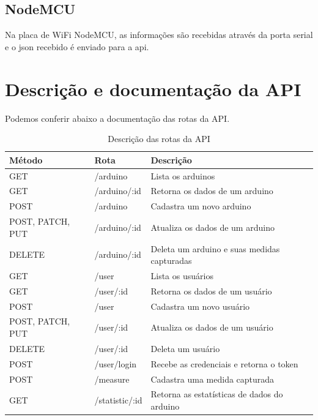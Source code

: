 \section{NodeMCU}

Na placa de WiFi NodeMCU, as informações são recebidas através da porta serial e o json recebido é enviado para a api.

\chapter{Descrição e documentação da API}

Podemos conferir abaixo a documentação das rotas da API.

\begin{table}[H]
    \centering
    \caption{Descrição das rotas da API}
    \label{table_api_routes}
    \begin{tabular}{|l|l|l|}
    \hline
    \textbf{Método}  & \textbf{Rota}        & \textbf{Descrição}                           \\ \hline
    GET              & /arduino             & Lista os arduinos                            \\ \hline
    GET              & /arduino/:id         & Retorna os dados de um arduino               \\ \hline
    POST             & /arduino             & Cadastra um novo arduino                     \\ \hline
    POST, PATCH, PUT & /arduino/:id         & Atualiza os dados de um arduino              \\ \hline
    DELETE           & /arduino/:id         & Deleta um arduino e suas medidas capturadas  \\ \hline
    GET              & /user                & Lista os usuários                            \\ \hline
    GET              & /user/:id            & Retorna os dados de um usuário               \\ \hline
    POST             & /user                & Cadastra um novo usuário                     \\ \hline
    POST, PATCH, PUT & /user/:id            & Atualiza os dados de um usuário              \\ \hline
    DELETE           & /user/:id            & Deleta um usuário                            \\ \hline
    POST             & /user/login          & Recebe as credenciais e retorna o token      \\ \hline
    POST             & /measure             & Cadastra uma medida capturada                \\ \hline
    GET              & /statistic/:id       & Retorna as estatísticas de dados do arduino  \\ \hline
    \end{tabular}
\end{table}

